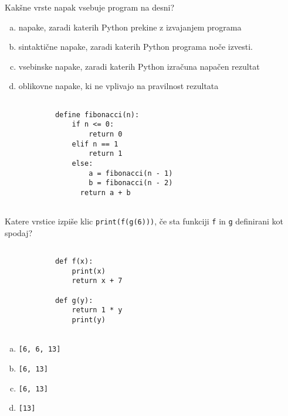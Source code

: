 \documentclass[arhiv, 10pt]{../izpit}
\newcommand{\inlinepy}[1]{\texttt{#1}}
\begin{document}
        \naloga*
        \begin{multicols}{2}
        \noindent
        Kakšne vrste napak vsebuje program na desni?

        \begin{enumerate}[(a)]
\item napake, zaradi katerih Python prekine z izvajanjem programa
\item sintaktične napake, zaradi katerih Python programa noče izvesti.
\item vsebinske napake, zaradi katerih Python izračuna napačen rezultat
\item oblikovne napake, ki ne vplivajo na pravilnost rezultata
\end{enumerate}

        \columnbreak

        \begin{verbatim}
        
            define fibonacci(n):
                if n <= 0:
                    return 0
                elif n == 1
                    return 1
                else:
                    a = fibonacci(n - 1)
                    b = fibonacci(n - 2)
                  return a + b
            
        \end{verbatim}

        \end{multicols}

    
        \naloga*
        Katere vrstice izpiše klic \inlinepy{print(f(g(6)))}, če sta funkciji \inlinepy{f} in \inlinepy{g} definirani kot spodaj?

        \begin{multicols}{2}
        \begin{verbatim}
        
            def f(x):
                print(x)
                return x + 7

            def g(y):
                return 1 * y
                print(y)
        
        \end{verbatim}

        \begin{enumerate}[(a)]
\item \inlinepy{[6, 6, 13]}
\item \inlinepy{[6, 13]}
\item \inlinepy{[6, 13]}
\item \inlinepy{[13]}
\end{enumerate}

        \end{multicols}
    
\end{document}
